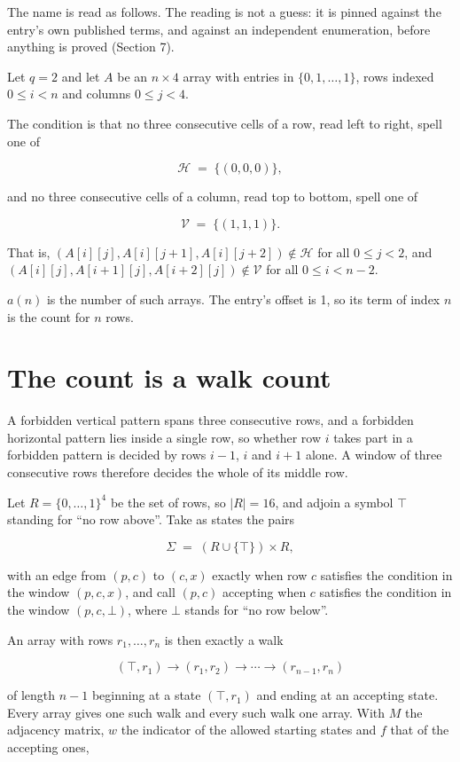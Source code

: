 \documentclass[11pt]{article}
\theoremstyle{definition}
\begin{document}
The name is read as follows. The reading is not a guess: it is pinned against the entry's own published terms, and against an independent enumeration, before anything is proved (Section 7).

Let $q = 2$ and let $A$ be an $n \times 4$ array with entries in $\{0,1,\dots,1\}$, rows indexed $0 \le i < n$ and columns $0 \le j < 4$.

The condition is that no three consecutive cells of a row, read left to right, spell one of

\[\mathcal{H} \;=\; \{(0,0,0)\},\]

and no three consecutive cells of a column, read top to bottom, spell one of

\[\mathcal{V} \;=\; \{(1,1,1)\}.\]

That is, $(A[i][j],A[i][j{+}1],A[i][j{+}2]) \notin \mathcal{H}$ for all $0 \le j < 2$, and $(A[i][j],A[i{+}1][j],A[i{+}2][j]) \notin \mathcal{V}$ for all $0 \le i < n-2$.

$a(n)$ is the number of such arrays. The entry's offset is 1, so its term of index $n$ is the count for $n$ rows.

\section{The count is a walk count}

A forbidden vertical pattern spans three consecutive rows, and a forbidden horizontal pattern lies inside a single row, so whether row $i$ takes part in a forbidden pattern is decided by rows $i-1$, $i$ and $i+1$ alone. A window of three consecutive rows therefore decides the whole of its middle row.

Let $R = \{0,\dots,1\}^{4}$ be the set of rows, so $|R| = 16$, and adjoin a symbol $\top$ standing for ``no row above''. Take as states the pairs

\[\Sigma \;=\; (R \cup \{\top\}) \times R,\]

with an edge from $(p,c)$ to $(c,x)$ exactly when row $c$ satisfies the condition in the window $(p,c,x)$, and call $(p,c)$ accepting when $c$ satisfies the condition in the window $(p,c,\bot)$, where $\bot$ stands for ``no row below''.

An array with rows $r_1,\dots,r_n$ is then exactly a walk

\[(\top,r_1) \to (r_1,r_2) \to \cdots \to (r_{n-1},r_n)\]

of length $n-1$ beginning at a state $(\top,r_1)$ and ending at an accepting state. Every array gives one such walk and every such walk one array. With $M$ the adjacency matrix, $w$ the indicator of the allowed starting states and $f$ that of the accepting ones,
\end{document}

